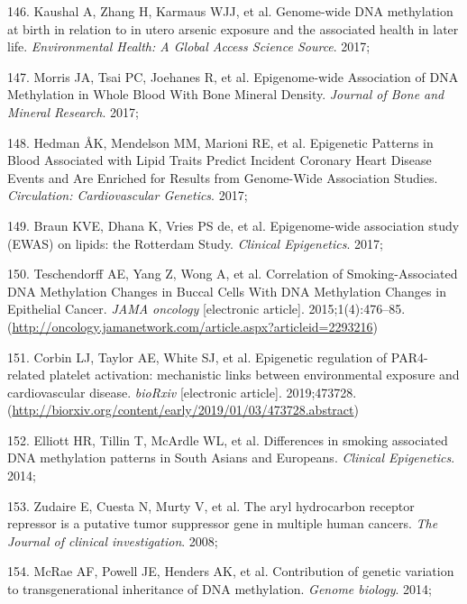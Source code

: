 \documentclass[11pt,oneside]{bristolthesis}
\newenvironment{cslreferences}%
  {}%
  {\par}
\begin{document}
\begin{cslreferences}
\leavevmode\hypertarget{ref-Kaushal2017}{}%
146. Kaushal A, Zhang H, Karmaus WJJ, et al. Genome-wide DNA methylation at birth in relation to in utero arsenic exposure and the associated health in later life. \emph{Environmental Health: A Global Access Science Source}. 2017;

\leavevmode\hypertarget{ref-Morris2017}{}%
147. Morris JA, Tsai PC, Joehanes R, et al. Epigenome-wide Association of DNA Methylation in Whole Blood With Bone Mineral Density. \emph{Journal of Bone and Mineral Research}. 2017;

\leavevmode\hypertarget{ref-Hedman2017}{}%
148. Hedman ÅK, Mendelson MM, Marioni RE, et al. Epigenetic Patterns in Blood Associated with Lipid Traits Predict Incident Coronary Heart Disease Events and Are Enriched for Results from Genome-Wide Association Studies. \emph{Circulation: Cardiovascular Genetics}. 2017;

\leavevmode\hypertarget{ref-Braun2017}{}%
149. Braun KVE, Dhana K, Vries PS de, et al. Epigenome-wide association study (EWAS) on lipids: the Rotterdam Study. \emph{Clinical Epigenetics}. 2017;

\leavevmode\hypertarget{ref-Teschendorff2015}{}%
150. Teschendorff AE, Yang Z, Wong A, et al. Correlation of Smoking-Associated DNA Methylation Changes in Buccal Cells With DNA Methylation Changes in Epithelial Cancer. \emph{JAMA oncology} {[}electronic article{]}. 2015;1(4):476--85. (\url{http://oncology.jamanetwork.com/article.aspx?articleid=2293216})

\leavevmode\hypertarget{ref-Corbin2019}{}%
151. Corbin LJ, Taylor AE, White SJ, et al. Epigenetic regulation of PAR4-related platelet activation: mechanistic links between environmental exposure and cardiovascular disease. \emph{bioRxiv} {[}electronic article{]}. 2019;473728. (\url{http://biorxiv.org/content/early/2019/01/03/473728.abstract})

\leavevmode\hypertarget{ref-Elliott2014}{}%
152. Elliott HR, Tillin T, McArdle WL, et al. Differences in smoking associated DNA methylation patterns in South Asians and Europeans. \emph{Clinical Epigenetics}. 2014;

\leavevmode\hypertarget{ref-Zudaire2008}{}%
153. Zudaire E, Cuesta N, Murty V, et al. The aryl hydrocarbon receptor repressor is a putative tumor suppressor gene in multiple human cancers. \emph{The Journal of clinical investigation}. 2008;

\leavevmode\hypertarget{ref-McRae2014}{}%
154. McRae AF, Powell JE, Henders AK, et al. Contribution of genetic variation to transgenerational inheritance of DNA methylation. \emph{Genome biology}. 2014;


\end{cslreferences}
\end{document}
